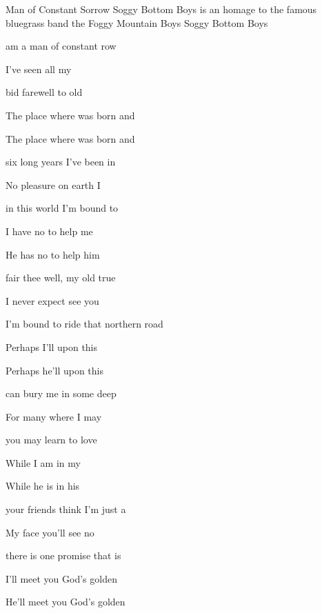 \begin{SBSong}{Man of Constant Sorrow}
  {Soggy Bottom Boys is an homage to the famous bluegrass band the Foggy Mountain Boys}
  {Soggy Bottom Boys}
  \begin{SBVerse}
     am a man of constant row
    
    I've seen  all my 
    
     bid farewell to old 
    
    The place where  was born and 
    
    The place where  was born and 
  \end{SBVerse}
  \begin{SBVerse}
     six long years I've been in 
    
    No pleasure  on earth I 
    
     in this world I'm bound to 
    
    I have no  to help me 
    
    He has no  to help him 
  \end{SBVerse}
  \begin{SBVerse}
     fair thee well, my old true 
    
    I never expect  see you 
  
     I'm bound to ride that northern road
    
    Perhaps I'll  upon this 
    
    Perhaps he'll  upon this 
  \end{SBVerse}
  \begin{SBVerse}
     can bury me in some deep 
    
    For many  where I may 

     you may learn to love 
    
    While I am  in my 

    While he is  in his 
  \end{SBVerse}
  \begin{SBVerse}
     your friends think I'm just a 
    
    My face you'll  see no 
    
     there is one promise that is 
    
    I'll meet you  God's golden 
    
    He'll meet you  God's golden 
  \end{SBVerse}
\end{SBSong}
